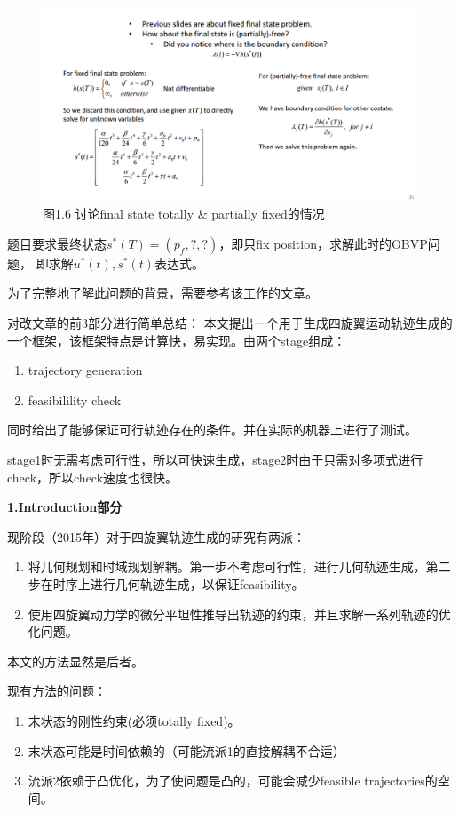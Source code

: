\documentclass[40pt,a4paper,UTF8]{ctexart}
\numberwithin{equation}{section}
\begin{document}
\begin{figure}[H]
\centering
\includegraphics[width=4.8in]{ch4_6.png} {图1.6 讨论final state totally \& partially fixed的情况}
\end{figure}

题目要求最终状态$s^*(T)=(p_f, ?, ?)$，即只fix position，求解此时的OBVP问题，
即求解$u^*(t),s^*(t)$表达式。

为了完整地了解此问题的背景，需要参考该工作的文章\cite{ref1}。

对改文章的前3部分进行简单总结：
本文提出一个用于生成四旋翼运动轨迹生成的一个框架，该框架特点是计算快，易实现。由两个stage组成：
\begin{enumerate}
    \item trajectory generation
    \item feasibilility check
    \end{enumerate}
同时给出了能够保证可行轨迹存在的条件。并在实际的机器上进行了测试。

stage1时无需考虑可行性，所以可快速生成，stage2时由于只需对多项式进行check，所以check速度也很快。

\textbf{1.Introduction部分}

现阶段（2015年）对于四旋翼轨迹生成的研究有两派：
\begin{enumerate}
\item 将几何规划和时域规划解耦。第一步不考虑可行性，进行几何轨迹生成，第二步在时序上进行几何轨迹生成，以保证feasibility。
\item 使用四旋翼动力学的微分平坦性推导出轨迹的约束，并且求解一系列轨迹的优化问题。
\end{enumerate}
本文的方法显然是后者。

现有方法的问题：
\begin{enumerate}
\item 末状态的刚性约束(必须totally fixed)。
\item 末状态可能是时间依赖的（可能流派1的直接解耦不合适）
\item 流派2依赖于凸优化，为了使问题是凸的，可能会减少feasible trajectories的空间。
\end{enumerate}
\end{document}
